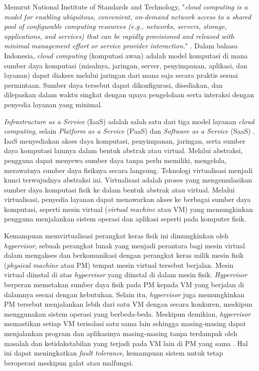 Menurut National Institute of Standards and Technology, "\textit{cloud computing is a model for enabling ubiquitous, convenient, on-demand network access to a shared pool of configurable computing resources (e.g., networks, servers, storage, applications, and services) that can be rapidly provisioned and released with minimal management effort or service provider interaction}." \citet{MellGrance2011}. Dalam bahasa Indonesia, \textit{cloud computing} (komputasi awan) adalah model komputasi di mana sumber daya komputasi (misalnya, jaringan, server, penyimpanan, aplikasi, dan layanan) dapat diakses melalui jaringan dari mana saja secara praktis sesuai permintaan. Sumber daya tersebut dapat dikonfigurasi, disediakan, dan dilepaskan dalam waktu singkat dengan upaya pengelolaan serta interaksi dengan penyedia layanan yang minimal. 

\textit{Infrastructure as a Service} (IaaS) adalah salah satu dari tiga model layanan \textit{cloud computing}, selain \textit{Platform as a Service} (PaaS) dan \textit{Software as a Service} (SaaS) \citet{MellGrance2011}. IaaS menyediakan akses daya komputasi, penyimpanan, jaringan, serta sumber daya komputasi lainnya dalam bentuk abstrak atau virtual. Melalui abstraksi, pengguna dapat menyewa sumber daya tanpa perlu memiliki, mengelola, merawatnya sumber daya fisiknya secara langsung. Teknologi virtualisasi menjadi kunci terwujudnya abstraksi ini. Virtualisasi adalah proses yang mengemulasikan sumber daya komputasi fisik ke dalam bentuk abstrak atau virtual. Melalui virtualisasi, penyedia layanan dapat menawarkan akses ke berbagai sumber daya komputasi, seperti mesin virtual (\textit{virtual machine} atau VM) yang memungkinkan pengguna menjalankan sistem operasi dan aplikasi seperti pada komputer fisik.
 
Kemampuan memvirtualisasi perangkat keras fisik ini dimungkinkan oleh \textit{hypervisor}, sebuah perangkat lunak yang menjadi perantara bagi mesin virtual dalam mengakses dan berkomunikasi dengan perangkat keras milik mesin fisik (\textit{physical machine} atau PM) tempat mesin virtual tersebut berjalan. Mesin virtual diinstal di atas \textit{hypervisor} yang diinstal di dalam mesin fisik. \textit{Hypervisor} berperan memetakan sumber daya fisik pada PM kepada VM yang berjalan di dalamnya sesuai dengan kebutuhan. Selain itu, \textit{hypervisor} juga memungkinkan PM tersebut menjalankan lebih dari satu VM dengan secara konkuren, meskipun menggunakan sistem operasi yang berbeda-beda. Meskipun demikian, \textit{hypervisor} memastikan setiap VM terisolasi satu sama lain sehingga masing-masing dapat menjalankan program dan aplikasinya masing-masing tanpa terdampak oleh masalah dan ketidakstabilan yang terjadi pada VM lain di PM yang sama \citep{Hill2013}. Hal ini dapat meningkatkan \textit{fault tolerance}, kemampuan sistem untuk tetap beroperasi meskipun galat atau malfungsi. 

